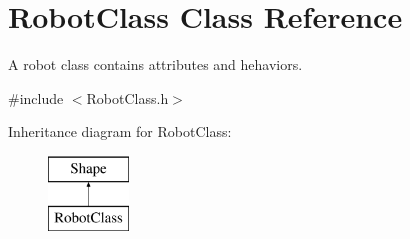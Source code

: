 \hypertarget{classRobotClass}{\section{Robot\-Class Class Reference}
\label{classRobotClass}
}


A robot class contains attributes and hehaviors.  




{\ttfamily \#include $<$Robot\-Class.\-h$>$}

Inheritance diagram for Robot\-Class\-:\begin{figure}[H]
\begin{center}
\leavevmode
\includegraphics[height=2.000000cm]{classRobotClass}
\end{center}
\end{figure}
